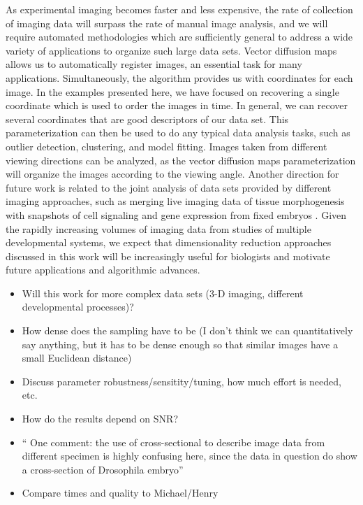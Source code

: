 \documentclass{pnastwo}
\begin{document}
\begin{article}
As experimental imaging becomes faster and less expensive, the rate of collection of imaging data will surpass the rate of manual image analysis,
and we will require automated methodologies which are sufficiently general to address a wide variety of applications to organize such large data sets.
%
Vector diffusion maps allows us to automatically register images, an essential task for many applications.
%
Simultaneously, the algorithm provides us with coordinates for each image.
%
In the examples presented here, we have focused on recovering a single coordinate which is used to order the images in time.
%
In general, we can recover several coordinates that are good descriptors of our data set.
%
This parameterization can then be used to do any typical data analysis tasks, such as outlier detection, clustering, and model fitting. 
%
Images taken from different viewing directions can be analyzed, as the vector diffusion maps parameterization will organize the images according to the viewing angle.
%
Another direction for future work is related to the joint analysis of data sets provided by different imaging approaches, such as merging live imaging data of tissue morphogenesis with snapshots of cell signaling and gene expression from fixed embryos \cite{krzic2012multiview, ichikawa2014live, rubel2010coupling}.  
%
Given the rapidly increasing volumes of imaging data from studies of multiple developmental systems, we expect that dimensionality reduction approaches discussed in this work will be increasingly useful for biologists and motivate future applications and algorithmic advances. 
  
  \begin{itemize}
  \item Will this work for more complex data sets (3-D imaging, different developmental processes)?
  \item How dense does the sampling have to be (I don't think we can quantitatively say anything, but it has to be dense enough so that similar images have a small Euclidean distance)
  \item Discuss parameter robustness/sensitity/tuning, how much effort is needed, etc.
  \item How do the results depend on SNR?
  \item `` One comment: the use of cross-sectional to describe image data from different specimen is highly confusing here, since the data in question do show a cross-section of Drosophila embryo''
  \item Compare times and quality to Michael/Henry
  \end{itemize}


\end{article}
\end{document}
